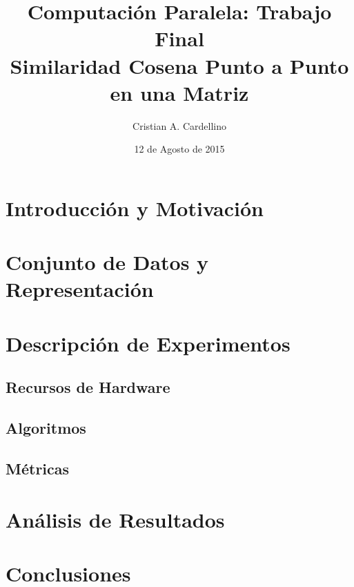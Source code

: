 \documentclass[11pt, a4paper]{article}
\title{
    Computación Paralela: Trabajo Final\\
    Similaridad Cosena Punto a Punto en una Matriz
}
\author{Cristian A. Cardellino}
\date{12 de Agosto de 2015}
\begin{document}
  \maketitle

  \section{Introducción y Motivación}

  \section{Conjunto de Datos y Representación}

  \section{Descripción de Experimentos}

  \subsection{Recursos de Hardware}

  \subsection{Algoritmos}

  \subsection{Métricas}

  \section{Análisis de Resultados}

  \section{Conclusiones}

%  
%  
\end{document}
